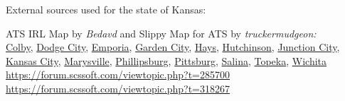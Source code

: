 















\vspace{2em}\footnoterule
{\footnotesize \noindent External sources used for the state of Kansas:
\begin{description}[
style=nextline,
leftmargin=1.1em,
labelsep=0pt,
parsep=0pt,
font=\normalfont,
]

\item[$\ast$]
ATS IRL Map by \textit{Bedavd} and Slippy Map for ATS by \textit{truckermudgeon:}\\
\hyperref[city:Colby]{Colby},
\hyperref[city:Dodge City]{Dodge City},
\hyperref[city:Emporia]{Emporia},
\hyperref[city:Garden City]{Garden City},
\hyperref[city:Hays]{Hays},
\hyperref[city:Hutchinson]{Hutchinson},
\hyperref[city:Junction City]{Junction City},
\hyperref[city:kansas_ci_ks]{Kansas City},
\hyperref[city:Marysville]{Marysville},
\hyperref[city:Phillipsburg]{Phillipsburg},
\hyperref[city:Pittsburg]{Pittsburg},
\hyperref[city:salina_ks]{Salina},
\hyperref[city:Topeka]{Topeka},
\hyperref[city:Wichita]{Wichita}
\\ \url{https://forum.scssoft.com/viewtopic.php?t=285700}
\\ \url{https://forum.scssoft.com/viewtopic.php?t=318267}

\end{description}
}
